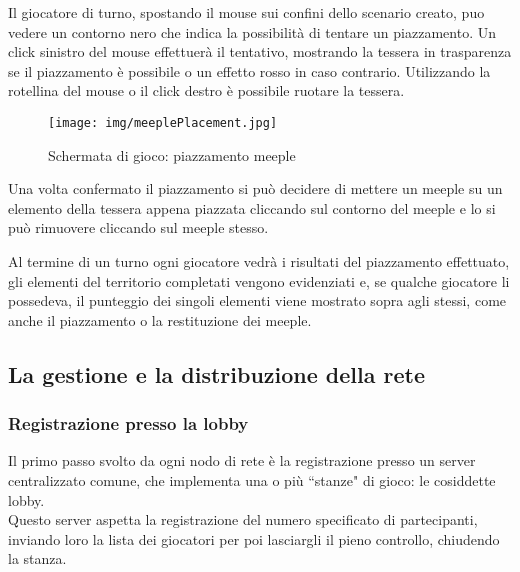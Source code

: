 Il giocatore di turno, spostando il mouse sui confini dello scenario creato, puo vedere un contorno nero che indica la possibilit\`a di tentare un piazzamento. Un click sinistro del mouse effettuer\`a il tentativo, mostrando la tessera in trasparenza se il piazzamento \`e possibile o un effetto rosso in caso contrario. 
Utilizzando la rotellina del mouse o il click destro \`e possibile ruotare la tessera.

\begin{figure}[htbp]
	\texttt{[image: img/meeplePlacement.jpg]}
	\caption{Schermata di gioco: piazzamento meeple}
	\label{img:gameMeeple}
\end{figure}

Una volta confermato il piazzamento si pu\`o decidere di mettere un meeple su un elemento della tessera appena piazzata cliccando sul contorno del meeple e lo si pu\`o rimuovere cliccando sul meeple stesso.

Al termine di un turno ogni giocatore vedr\`a i risultati del piazzamento effettuato, gli elementi del territorio completati vengono evidenziati e, se qualche giocatore li possedeva, il punteggio dei singoli elementi viene mostrato sopra agli stessi, come anche il piazzamento o la restituzione dei meeple.

\subsection{La gestione e la distribuzione della rete}
	\subsubsection{Registrazione presso la lobby}
		Il primo passo svolto da ogni nodo di rete \`e la registrazione
		presso un server centralizzato comune, che implementa una o pi\`u
		``stanze" di gioco: le cosiddette lobby.\\
		Questo server aspetta la registrazione del numero
		specificato di partecipanti, inviando loro la lista dei
		giocatori per poi lasciargli il pieno controllo, chiudendo la stanza.

